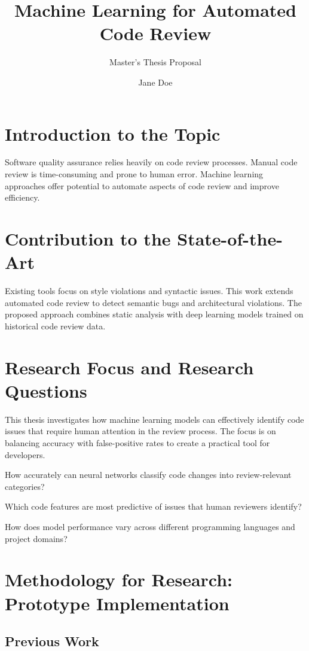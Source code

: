 \documentclass[usebib,embedsources]{compactarticle}
\title{Machine Learning for Automated Code Review}
\author{Jane Doe}
\subtitle{Master's Thesis Proposal}
\begin{document}
\section{Introduction to the Topic}

Software quality assurance relies heavily on code review processes.
Manual code review is time-consuming and prone to human error.
Machine learning approaches offer potential to automate aspects of code review and improve efficiency.

\section{Contribution to the State-of-the-Art}

Existing tools focus on style violations and syntactic issues.
This work extends automated code review to detect semantic bugs and architectural violations.
The proposed approach combines static analysis with deep learning models trained on historical code review data.

\section{Research Focus and Research Questions}

This thesis investigates how machine learning models can effectively identify code issues that require human attention in the review process.
The focus is on balancing accuracy with false-positive rates to create a practical tool for developers.

\begin{RQs}
\item How accurately can neural networks classify code changes into review-relevant categories?
\item Which code features are most predictive of issues that human reviewers identify?
\item How does model performance vary across different programming languages and project domains?
\end{RQs}

\section{Methodology for Research: Prototype Implementation}

\subsection{Previous Work}
\end{document}
